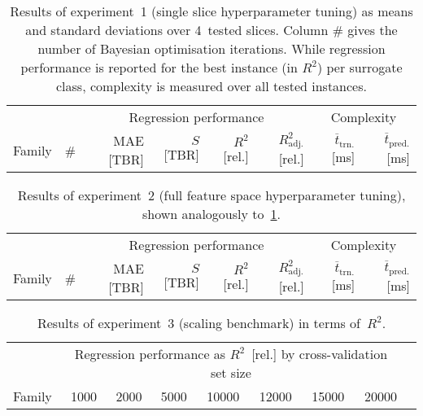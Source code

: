 \begin{table}[h]
	\centering
	{\footnotesize
		\begin{tabular}{lrrrrrrr}
		\toprule
		{} & {} & \multicolumn{4}{c}{Regression performance} &
		\multicolumn{2}{c}{Complexity}\\
		\cmidrule(lr){3-6}
		\cmidrule(lr){7-8}
		Family & \# & MAE [TBR] & $S$ [TBR] & $R^2$ [rel.] & $R^2_{\text{adj.}}$ [rel.]
						& $\overline{t}_{\text{trn.}}$ [\si{\milli\second}] &
						$\overline{t}_{\text{pred.}}$ [\si{\milli\second}]\\
		\midrule
		
		\bottomrule
		\end{tabular}
	}
	\caption{Results of experiment~1 (single slice hyperparameter tuning) as
		means and standard deviations over 4~tested slices. Column \# gives the number of Bayesian
		optimisation iterations. While regression performance is reported for the
		best instance (in $R^2$) per surrogate class, complexity is measured over all tested instances.}
	\label{tbl:exp1-detailed-results}
\end{table}

\begin{table}[h]
	\centering
	{\footnotesize
		\begin{tabular}{lrrrrrrr}
		\toprule
		{} & {} & \multicolumn{4}{c}{Regression performance} &
		\multicolumn{2}{c}{Complexity}\\
		\cmidrule(lr){3-6}
		\cmidrule(lr){7-8}
		Family & \# & MAE [TBR] & $S$ [TBR] & $R^2$ [rel.] & $R^2_{\text{adj.}}$ [rel.]
						& $\overline{t}_{\text{trn.}}$ [\si{\milli\second}] &
						$\overline{t}_{\text{pred.}}$ [\si{\milli\second}]\\
		\midrule
		
		\bottomrule
		\end{tabular}
	}
	\caption{Results of experiment~2 (full feature space hyperparameter tuning),
		shown analogously to~\cref{tbl:exp1-detailed-results}.}
	\label{tbl:exp2-detailed-results}
\end{table}

\begin{table}[h]
	\centering
	{\footnotesize
		\begin{tabular}{lrrrrrrrr}
		\toprule
		{} & \multicolumn{7}{c}{Regression performance as $R^2$~[rel.] by cross-validation set size}\\
		\cmidrule(lr){2-8}
		Family
						& \num{1000}
						& \num{2000}
						& \num{5000}
						& \num{10000}
						& \num{12000}
						& \num{15000}
						& \num{20000}\\
		\midrule
		
		\bottomrule
		\end{tabular}
	}
	\caption{Results of experiment~3 (scaling benchmark) in ter\si{\milli\second} of~$R^2$.}
	\label{tbl:exp3-detailed-results-r2}
\end{table}

